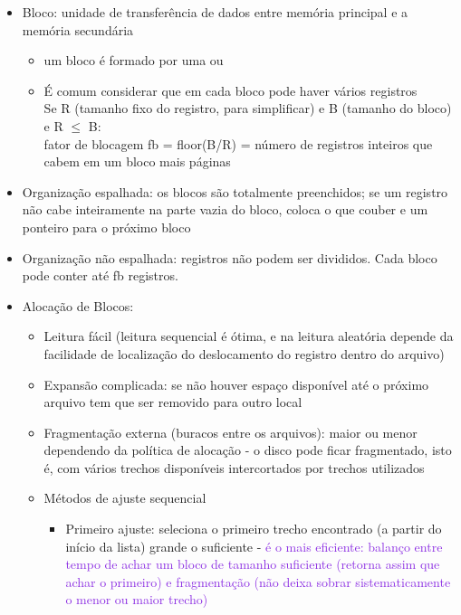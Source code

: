 \documentclass[a4paper, 12pt]{article}
\begin{document}
\begin{itemize}
\item Bloco: unidade de transferência de dados entre memória principal e a memória secundária
\begin{itemize}
\item um bloco é formado por uma ou

\item É comum considerar que em cada bloco pode haver vários registros\\
Se R (tamanho fixo do registro, para
simplificar) e B (tamanho do bloco) e R $\leq$ B:\\
fator de blocagem fb = floor(B/R) = número de registros inteiros que cabem em um bloco
mais páginas
\end{itemize}

\item Organização espalhada: os blocos são
totalmente preenchidos; se um registro não
cabe inteiramente na parte vazia do bloco,
coloca o que couber e um ponteiro para o
próximo bloco

\item Organização não espalhada: registros não podem ser divididos. Cada bloco pode conter até fb registros.

\item Alocação de Blocos:


\begin{itemize}
\item Leitura fácil (leitura sequencial é ótima, e na leitura aleatória depende da
facilidade de localização do deslocamento do registro dentro do arquivo)
\item Expansão complicada: se não houver espaço disponível até o próximo
arquivo tem que ser removido para outro local
\item Fragmentação externa (buracos entre os arquivos): maior ou menor dependendo da política de alocação - o disco pode ficar fragmentado, isto é, com vários trechos disponíveis intercortados por trechos utilizados
\end{itemize}

\begin{itemize}
\item Métodos de ajuste sequencial

\begin{itemize}
\item Primeiro ajuste: seleciona o primeiro trecho encontrado (a partir do início da lista) grande o suficiente - \textcolor{BlueViolet}{é o mais eficiente: balanço entre tempo de achar um bloco
de tamanho suficiente (retorna assim que achar o primeiro) e fragmentação
(não deixa sobrar sistematicamente o menor ou maior trecho)}


\end{itemize}
\end{itemize}
\end{itemize}
\end{document}
